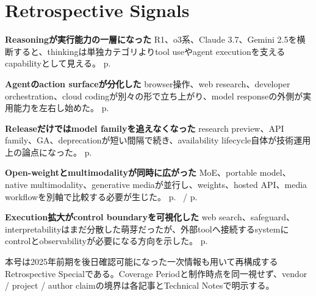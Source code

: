 \section*{Retrospective Signals}
\smallskip
\noindent\textbf{Reasoningが実行能力の一層になった} R1、o3系、Claude 3.7、Gemini 2.5を横断すると、thinkingは単独カテゴリよりtool useやagent executionを支えるcapabilityとして見える。 \hfill{\footnotesize p.~\pageref{pkg:reasoning}}\par
\smallskip
\noindent\textbf{Agentのaction surfaceが分化した} browser操作、web research、developer orchestration、cloud codingが別々の形で立ち上がり、model responseの外側が実用能力を左右し始めた。 \hfill{\footnotesize p.~\pageref{pkg:agents}}\par
\smallskip
\noindent\textbf{Releaseだけではmodel familyを追えなくなった} research preview、API family、GA、deprecationが短い間隔で続き、availability lifecycle自体が技術運用上の論点になった。 \hfill{\footnotesize p.~\pageref{pkg:lifecycle}}\par
\smallskip
\noindent\textbf{Open-weightとmultimodalityが同時に広がった} MoE、portable model、native multimodality、generative mediaが並行し、weights、hosted API、media workflowを別軸で比較する必要が生じた。 \hfill{\footnotesize p.~\pageref{pkg:open} / p.~\pageref{pkg:multimodal}}\par
\smallskip
\noindent\textbf{Execution拡大がcontrol boundaryを可視化した} web search、safeguard、interpretabilityはまだ分散した萌芽だったが、外部toolへ接続するsystemにcontrolとobservabilityが必要になる方向を示した。 \hfill{\footnotesize p.~\pageref{pkg:control}}\par
\medskip
\begin{claimboundary}
本号は2025年前期を後日確認可能になった一次情報も用いて再構成するRetrospective Specialである。Coverage Periodと制作時点を同一視せず、vendor / project / author claimの境界は各記事とTechnical Notesで明示する。
\end{claimboundary}
\medskip
\setcounter{tocdepth}{1}
\tableofcontents
